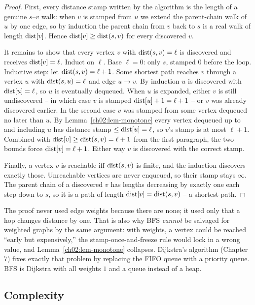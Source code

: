 \begin{proof}
First, every distance stamp written by the algorithm is the length of a genuine
$s$--$v$ walk: when $v$ is stamped from $u$ we extend the parent-chain walk of
$u$ by one edge, so by induction the parent chain from $v$ back to $s$ is a real
walk of length $\operatorname{dist}[v]$. Hence $\operatorname{dist}[v]\ge\operatorname{dist}(s,v)$ for every discovered
$v$.

It remains to show that every vertex $v$ with $\operatorname{dist}(s,v)=\ell$ is discovered and
receives $\operatorname{dist}[v]=\ell$. Induct on $\ell$. Base $\ell=0$: only $s$, stamped $0$
before the loop. Inductive step: let $\operatorname{dist}(s,v)=\ell+1$. Some shortest path
reaches $v$ through a vertex $u$ with $\operatorname{dist}(s,u)=\ell$ and edge $u\to v$. By
induction $u$ is discovered with $\operatorname{dist}[u]=\ell$, so $u$ is eventually dequeued.
When $u$ is expanded, either $v$ is still undiscovered -- in which case $v$ is
stamped $\operatorname{dist}[u]+1=\ell+1$ -- or $v$ was already discovered earlier. In the
second case $v$ was stamped from some vertex dequeued no later than $u$. By
Lemma~\ref{ch02:lem-monotone} every vertex dequeued up to and including $u$ has
distance stamp $\le \operatorname{dist}[u]=\ell$, so $v$'s stamp is at most $\ell+1$. Combined
with $\operatorname{dist}[v]\ge\operatorname{dist}(s,v)=\ell+1$ from the first paragraph, the two bounds force
$\operatorname{dist}[v]=\ell+1$. Either way $v$ is discovered with the correct stamp.

Finally, a vertex $v$ is reachable iff $\operatorname{dist}(s,v)$ is finite, and the induction
discovers exactly those. Unreachable vertices are never enqueued, so their stamp
stays $\infty$. The parent chain of a discovered $v$ has lengths decreasing by
exactly one each step down to $s$, so it is a path of length
$\operatorname{dist}[v]=\operatorname{dist}(s,v)$ -- a shortest path.
\end{proof}

\begin{whybox}
The proof never used edge weights because there are none; it used only that a
hop changes distance by one. That is also why BFS \emph{cannot} be salvaged for
weighted graphs by the same argument: with weights, a vertex could be reached
``early but expensively,'' the stamp-once-and-freeze rule would lock in a wrong
value, and Lemma~\ref{ch02:lem-monotone} collapses. Dijkstra's algorithm
(Chapter 7) fixes exactly that problem by replacing the FIFO queue with a
priority queue. BFS is Dijkstra with all weights $1$ and a queue instead of a
heap.
\end{whybox}

\subsection{Complexity}

